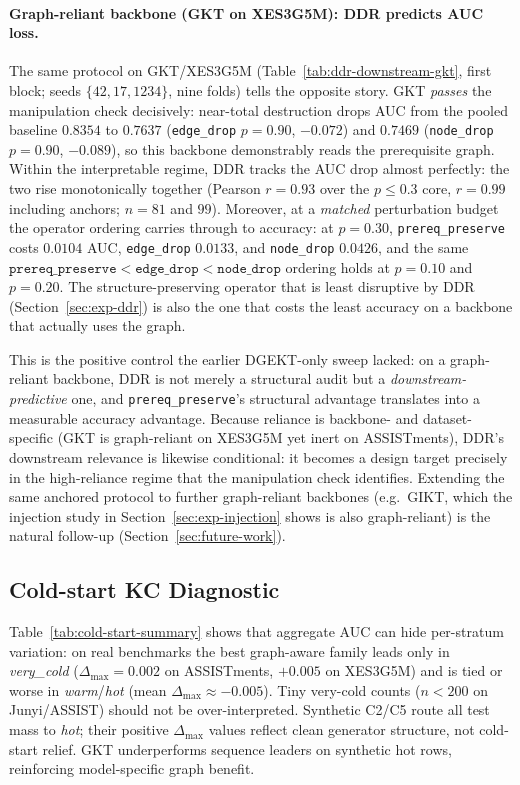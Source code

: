 \documentclass[pdflatex,sn-mathphys-num]{sn-jnl}
\newcommand{\DDR}{\textsc{DDR}}
\newenvironment{revbox}{}{}
\begin{document}
\begin{revbox}
\paragraph{Graph-reliant backbone (GKT on XES3G5M): \DDR{} predicts AUC loss.}
The same protocol on GKT/XES3G5M (Table~\ref{tab:ddr-downstream-gkt}, first
block; seeds $\{42,17,1234\}$, nine folds) tells the opposite story. GKT \emph{passes} the
manipulation check decisively: near-total destruction drops AUC from the
pooled baseline $0.8354$ to $0.7637$ (\texttt{edge\_drop} $p{=}0.90$, ${-}0.072$) and
$0.7469$ (\texttt{node\_drop} $p{=}0.90$, ${-}0.089$), so this backbone
demonstrably reads the prerequisite graph. Within the interpretable regime,
\DDR{} tracks the AUC drop almost perfectly: the two rise monotonically together
(Pearson $r{=}0.93$ over the $p{\le}0.3$ core, $r{=}0.99$ including anchors;
$n{=}81$ and $99$). Moreover, at a \emph{matched} perturbation budget the
operator ordering carries through to accuracy: at $p{=}0.30$,
\texttt{prereq\_preserve} costs $0.0104$ AUC, \texttt{edge\_drop} $0.0133$, and
\texttt{node\_drop} $0.0426$, and the same
$\texttt{prereq\_preserve}<\texttt{edge\_drop}<\texttt{node\_drop}$ ordering
holds at $p{=}0.10$ and $p{=}0.20$. The structure-preserving operator that is
least disruptive by \DDR{} (Section~\ref{sec:exp-ddr}) is also the one that
costs the least accuracy on a backbone that actually uses the graph.

This is the positive control the earlier DGEKT-only sweep lacked: on a
graph-reliant backbone, \DDR{} is not merely a structural audit but a
\emph{downstream-predictive} one, and \texttt{prereq\_preserve}'s structural
advantage translates into a measurable accuracy advantage. Because reliance is
backbone- and dataset-specific (GKT is graph-reliant on XES3G5M yet inert on
ASSISTments), \DDR{}'s downstream relevance is likewise conditional: it becomes
a design target precisely in the high-reliance regime that the manipulation
check identifies. Extending the same anchored protocol to further graph-reliant
backbones (e.g.\ GIKT, which the injection study in
Section~\ref{sec:exp-injection} shows is also graph-reliant) is the natural
follow-up (Section~\ref{sec:future-work}).
\end{revbox}
\subsection{Cold-start KC Diagnostic}
\label{sec:exp-coldstart}

Table~\ref{tab:cold-start-summary} shows that aggregate AUC can hide
per-stratum variation: on real benchmarks the best graph-aware family
leads only in \emph{very\_cold} ($\Delta_{\max}{=}0.002$ on ASSISTments,
$+0.005$ on XES3G5M) and is tied or worse in \emph{warm}/\emph{hot}
(mean $\Delta_{\max}{\approx}{-}0.005$). Tiny very-cold counts ($n{<}200$
on Junyi/ASSIST) should not be over-interpreted. Synthetic C2/C5 route
all test mass to \emph{hot}; their positive $\Delta_{\max}$ values
reflect clean generator structure, not cold-start relief. GKT underperforms
sequence leaders on synthetic hot rows, reinforcing model-specific graph benefit.
\end{document}
